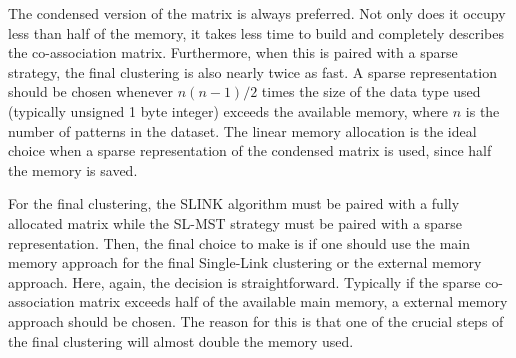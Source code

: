 The condensed version of the matrix is always preferred.
Not only does it occupy less than half of the memory, it takes less time to build and completely describes the co-association matrix.
Furthermore, when this is paired with a sparse strategy, the final clustering is also nearly twice as fast.
A sparse representation should be chosen whenever $n (n-1) / 2$ times the size of the data type used (typically unsigned 1 byte integer) exceeds the available memory, where $n$ is the number of patterns in the dataset.
The linear memory allocation is the ideal choice when a sparse representation of the condensed matrix is used, since half the memory is saved.

For the final clustering, the SLINK algorithm must be paired with a fully allocated matrix while the SL-MST strategy must be paired with a sparse representation.
Then, the final choice to make is if one should use the main memory approach for the final Single-Link clustering or the external memory approach.
Here, again, the decision is straightforward.
Typically if the sparse co-association matrix exceeds half of the available main memory, a external memory approach should be chosen.
The reason for this is that one of the crucial steps of the final clustering will almost double the memory used.